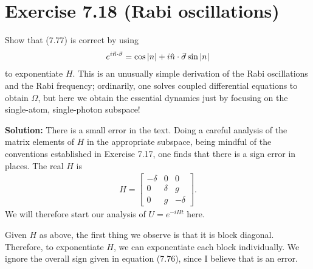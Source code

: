 \documentclass{book}
\begin{document}
    

\section*{Exercise 7.18 (Rabi oscillations)}
    Show that (7.77) is correct by using
    \begin{align}
        e^{i \vec{n}\cdot \vec{\sigma}} = \cos\abs{n} + i \hat{n}\cdot\vec{\sigma} \sin\abs{n}
    \end{align}
    to exponentiate $H$. This is an unusually simple derivation of the Rabi oscillations and the Rabi frequency; ordinarily, one solves coupled differential equations to obtain $\Omega$, but here we obtain the essential dynamics just by focusing on the single-atom, single-photon subspace!

    \textbf{Solution:} There is a small error in the text. Doing a careful analysis of the matrix elements of $H$ in the appropriate subspace, being mindful of the conventions established in Exercise 7.17, one finds that there is a sign error in places. The real $H$ is 
    \begin{align}
        H = \begin{bmatrix}
            -\delta & 0 & 0 \\
            0 & \delta & g \\
            0 & g & -\delta
        \end{bmatrix}.
    \end{align}
    We will therefore start our analysis of $U = e^{-i H t}$ here. 
    
    Given $H$ as above, the first thing we observe is that it is block diagonal. Therefore, to exponentiate $H$, we can exponentiate each block individually. We ignore the overall sign given in equation (7.76), since I believe that is an error.
\end{document}
